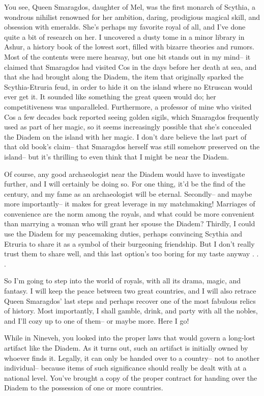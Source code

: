 \documentclass[char]{Kos}
\begin{document}
You see, Queen Smaragdos, daughter of Mel, was the first monarch of Scythia, a wondrous nihilist renowned for her ambition, daring, prodigious magical skill, and obsession with emeralds. She's perhaps my favorite royal of all, and I've done quite a bit of research on her. I uncovered a dusty tome in a minor library in Ashur, a history book of the lowest sort, filled with bizarre theories and rumors. Most of the contents were mere hearsay, but one bit stands out in my mind-- it claimed that Smaragdos had visited Cos in the days before her death at sea, and that she had brought along the Diadem, the item that originally sparked the Scythia-Etruria feud, in order to hide it on the island where no Etruscan would ever get it. It sounded like something the great queen would do; her competitiveness was unparalleled. Furthermore, a professor of mine who visited Cos a few decades back reported seeing golden sigils, which Smaragdos frequently used as part of her magic, so it seems increasingly possible that she's concealed the Diadem on the island with her magic. I don't dare believe the last part of that old book's claim-- that Smaragdos herself was still somehow preserved on the island-- but it's thrilling to even think that I might be near the Diadem.

Of course, any good archaeologist near the Diadem would have to investigate further, and I will certainly be doing so. For one thing, it'd be the find of the century, and my fame as an archaeologist will be eternal. Secondly-- and maybe more importantly-- it makes for great leverage in my matchmaking! Marriages of convenience are the norm among the royals, and what could be more convenient than marrying a woman who will grant her spouse the Diadem? Thirdly, I could use the Diadem for my peacemaking duties, perhaps convincing Scythia and Etruria to share it as a symbol of their burgeoning friendship. But I don't really trust them to share well, and this last option's too boring for my taste anyway . . .

So I'm going to step into the world of royals, with all its drama, magic, and fantasy. I will keep the peace between two great countries, and I will also retrace Queen Smaragdos' last steps and perhaps recover one of the most fabulous relics of history. Most importantly, I shall gamble, drink, and party with all the nobles, and I'll cozy up to one of them-- or maybe more. Here I go!

\begin{itemz}[Notes]
  \item While in Nineveh, you looked into the proper laws that would govern a long-lost artifact like the Diadem. As it turns out, such an artifact is initially owned by whoever finds it. Legally, it can only be handed over to a country-- not to another individual-- because items of such significance should really be dealt with at a national level. You've brought a copy of the proper contract for handing over the Diadem to the possession of one or more countries.
  \end{itemz}
\end{document}
